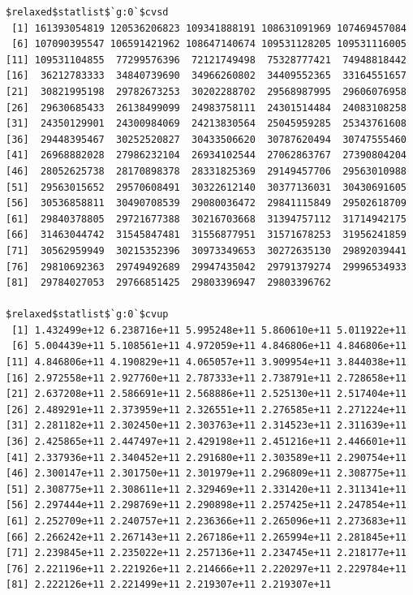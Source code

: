 \documentclass[
]{article}
\begin{document}
\begin{verbatim}
$relaxed$statlist$`g:0`$cvsd
 [1] 161393054819 120536206823 109341888191 108631091969 107469457084
 [6] 107090395547 106591421962 108647140674 109531128205 109531116005
[11] 109531104855  77299576396  72121749498  75328777421  74948818442
[16]  36212783333  34840739690  34966260802  34409552365  33164551657
[21]  30821995198  29782673253  30202288702  29568987995  29606076958
[26]  29630685433  26138499099  24983758111  24301514484  24083108258
[31]  24350129901  24300984069  24213830564  25045959285  25343761608
[36]  29448395467  30252520827  30433506620  30787620494  30747555460
[41]  26968882028  27986232104  26934102544  27062863767  27390804204
[46]  28052625738  28170898378  28331825369  29149457706  29563010988
[51]  29563015652  29570608491  30322612140  30377136031  30430691605
[56]  30536858811  30490708539  29080036472  29841115849  29502618709
[61]  29840378805  29721677388  30216703668  31394757112  31714942175
[66]  31463044742  31545847481  31556877951  31571678253  31956241859
[71]  30562959949  30215352396  30973349653  30272635130  29892039441
[76]  29810692363  29749492689  29947435042  29791379274  29996534933
[81]  29784027053  29766851425  29803396947  29803396762

$relaxed$statlist$`g:0`$cvup
 [1] 1.432499e+12 6.238716e+11 5.995248e+11 5.860610e+11 5.011922e+11
 [6] 5.004439e+11 5.108561e+11 4.972059e+11 4.846806e+11 4.846806e+11
[11] 4.846806e+11 4.190829e+11 4.065057e+11 3.909954e+11 3.844038e+11
[16] 2.972558e+11 2.927760e+11 2.787333e+11 2.738791e+11 2.728658e+11
[21] 2.637208e+11 2.586691e+11 2.568886e+11 2.525130e+11 2.517404e+11
[26] 2.489291e+11 2.373959e+11 2.326551e+11 2.276585e+11 2.271224e+11
[31] 2.281182e+11 2.302450e+11 2.303763e+11 2.314523e+11 2.311639e+11
[36] 2.425865e+11 2.447497e+11 2.429198e+11 2.451216e+11 2.446601e+11
[41] 2.337936e+11 2.340452e+11 2.291680e+11 2.303589e+11 2.290754e+11
[46] 2.300147e+11 2.301750e+11 2.301979e+11 2.296809e+11 2.308775e+11
[51] 2.308775e+11 2.308611e+11 2.329469e+11 2.331420e+11 2.311341e+11
[56] 2.297444e+11 2.298769e+11 2.290898e+11 2.257425e+11 2.247854e+11
[61] 2.252709e+11 2.240757e+11 2.236366e+11 2.265096e+11 2.273683e+11
[66] 2.266242e+11 2.267143e+11 2.267186e+11 2.265994e+11 2.281845e+11
[71] 2.239845e+11 2.235022e+11 2.257136e+11 2.234745e+11 2.218177e+11
[76] 2.221196e+11 2.221926e+11 2.214666e+11 2.220297e+11 2.229784e+11
[81] 2.222126e+11 2.221499e+11 2.219307e+11 2.219307e+11


\end{verbatim}
\end{document}
